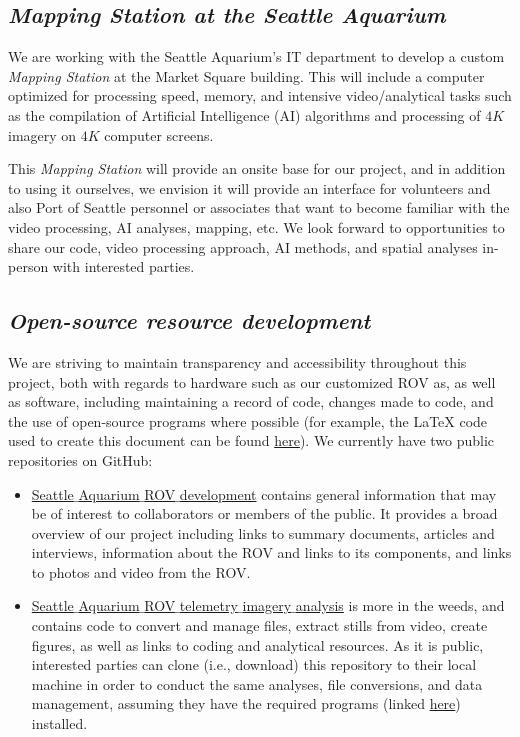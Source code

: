 \documentclass[11pt]{article}
\begin{document}
\subsection{\textit{Mapping Station at the Seattle Aquarium}}
We are working with the Seattle Aquarium's IT department to develop a 
custom \textit{Mapping Station} at the Market Square building. 
This will include a computer optimized for processing speed, memory, 
and intensive video/analytical tasks such as the compilation of 
Artificial Intelligence (AI) algorithms and processing of $4K$ 
imagery on $4K$ computer screens. 

This \textit{Mapping Station} will provide an onsite base for our 
project, and in addition to using it ourselves, we envision it will 
provide an interface for volunteers and also Port of Seattle personnel 
or associates that want to become familiar with the video processing, 
AI analyses, mapping, etc. 
We look forward to opportunities to share our code, video processing 
approach, AI methods, and spatial analyses in-person with interested 
parties.

\subsection{\textit{Open-source resource development}}
We are striving to maintain transparency and accessibility throughout 
this project, both with regards to hardware such as our customized ROV as, as well as software, including maintaining a record of code, changes made to code, and the use of open-source programs where possible (for example, the LaTeX code used to create this document can be found \href{https://github.com/zhrandell/Seattle_Aquarium_ROV_telemetry_imagery_analysis/delete/main/documents/Port_report_August/Urban_Kelp_August_report.tex}{here}).
We currently have two public repositories on GitHub: 

\begin{itemize}
\item 
\href{https://github.com/zhrandell/Seattle_Aquarium_ROV_development}{Seattle$\_$Aquarium$\_$ROV$\_$development}
contains general information that may be of interest to collaborators 
or members of the public.  
It provides a broad overview of our project including links to summary 
documents, articles and interviews, information about the ROV and links 
to its components, and links to photos and video from the ROV. 
\item
\href{https://github.com/zhrandell/Seattle_Aquarium_ROV_telemetry_imagery_analysis}{Seattle$\_$Aquarium$\_$ROV$\_$telemetry$\_$imagery$\_$analysis}
is more in the weeds, and contains code to convert and manage files, 
extract stills from video, create figures, as well as links to coding 
and analytical resources. 
As it is public, interested parties can clone (i.e., download) this 
repository to their local machine in order to conduct the same 
analyses, file conversions, and data management, assuming they have the 
required programs (linked 
\href{https://github.com/zhrandell/Seattle_Aquarium_ROV_development/blob/main/documents/hardware_software.md#rov-firmware-flight-programs--analytical-software}{here})
 installed.  
\end{itemize}
\end{document}
